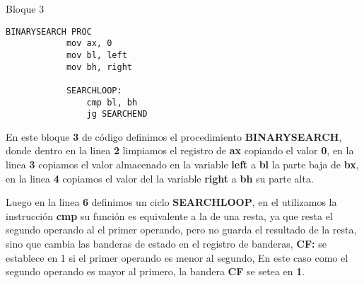 \documentclass[a4paper,twoside]{article}
\newcommand{\codebordo}[1]{\textcolor{codebordo}{#1}}
\newcommand{\codeblue}[1]{\textcolor{codeblue}{#1}}
\begin{document}
    \vspace*{1cm}
    \begin{center}
      {\normalsize Bloque 3}
      \begin{lstlisting}[language=8086]
        BINARYSEARCH PROC
            mov ax, 0
            mov bl, left
            mov bh, right
            
            SEARCHLOOP:
                cmp bl, bh
                jg SEARCHEND
      \end{lstlisting}
    \end{center} 
      \vspace*{0.5cm}
      {\Large En este bloque \textbf{3} de código definimos el procedimiento \codeblue{\textbf{BINARYSEARCH}}, donde dentro en la linea 
         \textbf{2} limpiamos el registro de \codebordo{\textbf{ax}} copiando el valor \textbf{0}, en la linea \textbf{3} copiamos
         el valor almacenado en la variable \textbf{left} a \codebordo{\textbf{bl}} la parte baja de \codebordo{\textbf{bx}}, en la linea \textbf{4}
         copiamos el valor del la variable \textbf{right} a \codebordo{\textbf{bh}} su parte alta.
      }

      {\Large Luego en la linea \textbf{6} definimos un ciclo \codeblue{\textbf{SEARCHLOOP}}, en el utilizamos la instrucción \codeblue{\textbf{cmp}}
          su función es equivalente a la de una resta, ya que resta el segundo operando al el primer operando, pero no guarda el resultado de la resta,
          sino que cambia las banderas de estado en el registro de banderas, \textbf{CF:} se establece en 1 si el primer operando es menor al segundo, 
          En este caso como el segundo operando es mayor al primero, la bandera \textbf{CF} se setea en \textbf{1}.
      }
\end{document}
